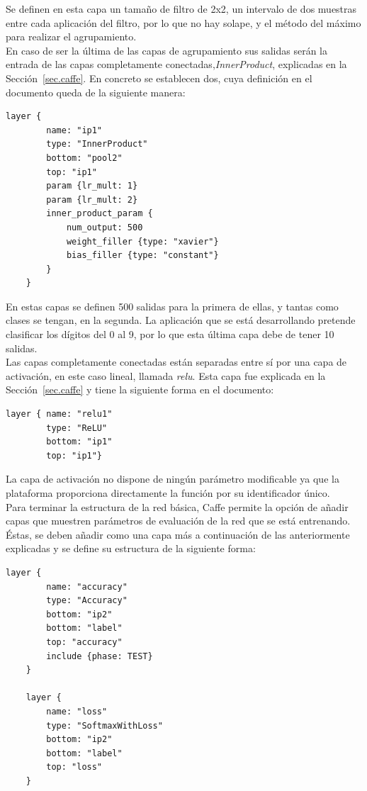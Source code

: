	Se definen en esta capa un tamaño de filtro de 2x2, un intervalo de dos muestras entre cada aplicación del filtro, por lo que no hay solape, y el método del máximo para realizar el agrupamiento.\\

	En caso de ser la última de las capas de agrupamiento sus salidas serán la entrada de las capas completamente conectadas,\textit{InnerProduct}, explicadas en la Sección~\ref{sec.caffe}. En concreto se establecen dos, cuya definición en el documento queda de la siguiente manera:\\
	\vspace{-10pt}
	
	\begin{lstlisting}[frame=single]
	layer {
		name: "ip1"
		type: "InnerProduct"
		bottom: "pool2"
		top: "ip1"
		param {lr_mult: 1}
		param {lr_mult: 2}
		inner_product_param {
			num_output: 500
			weight_filler {type: "xavier"}
			bias_filler {type: "constant"}
		}
	}	
	\end{lstlisting}
	
	En estas capas se definen 500 salidas para la primera de ellas, y tantas como clases se tengan, en la segunda. La aplicación que se está desarrollando pretende clasificar los dígitos del 0 al 9, por lo que esta última capa debe de tener 10 salidas.\\

	Las capas completamente conectadas están separadas entre sí por una capa de activación, en este caso lineal, llamada \textit{\acrshort{relu}}. Esta capa fue explicada en la Sección~\ref{sec.caffe} y tiene la siguiente forma en el documento:
	\vspace{10pt}
	\begin{lstlisting}[frame=single]
	layer { name: "relu1"
		type: "ReLU"
		bottom: "ip1"
		top: "ip1"}	
	\end{lstlisting}
	
	La capa de activación no dispone de ningún parámetro modificable ya que la plataforma proporciona directamente la función por su identificador único.\\
	
	Para terminar la estructura de la red básica, Caffe permite la opción de añadir capas que muestren parámetros de evaluación de la red que se está entrenando. Éstas, se deben añadir como una capa más a continuación de las anteriormente explicadas y se define su estructura de la siguiente forma:
	\vspace{10pt}
	\begin{lstlisting}[frame=single]
	layer {
		name: "accuracy"
		type: "Accuracy"
		bottom: "ip2"
		bottom: "label"
		top: "accuracy"
		include {phase: TEST}
	}
	
	layer {
		name: "loss"
		type: "SoftmaxWithLoss"
		bottom: "ip2"
		bottom: "label"
		top: "loss"
	}	
	\end{lstlisting}
	
